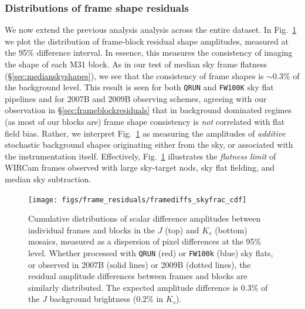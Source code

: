 \documentclass[iop]{emulateapj}
\newcommand{\mycomment}[1]{\textcolor{OliveGreen}{\textit{#1}}} %
\newcommand{\Fig}[1]{Fig.~\ref{fig:#1}}  %
\newcommand{\Sec}[1]{\S\ref{sec:#1}}  %
\begin{document}
\subsubsection{Distributions of frame shape residuals}
\label{sec:frameblockresidualhist}

We now extend the previous analysis analysis across the entire dataset.
In \Fig{frame_diffs_skyfrac} we plot the distribution of frame-block residual shape amplitudes, measured at the 95\% difference interval.
In essence, this measures the consistency of imaging the shape of each M31 block.
As in our test of median sky frame flatness (\Sec{medianskyshapes}), we see that the consistency of frame shapes is $\sim 0.3\%$ of the background level.
This result is seen for both \texttt{QRUN} and \texttt{FW100K} sky flat pipelines and for 2007B and 2009B observing schemes, agreeing with our observation in \Sec{frameblockresiduals} that in background dominated regimes (as most of our blocks are) frame shape consistency is \emph{not} correlated with flat field bias.
Rather, we interpret \Fig{frame_diffs_skyfrac} as measuring the amplitudes of \emph{additive} stochastic background shapes originating either from the sky, or associated with the instrumentation itself.
Effectively, \Fig{frame_diffs_skyfrac} illustrates the \emph{flatness limit} of WIRCam frames observed with large sky-target nods, sky flat fielding, and median sky subtraction.

\begin{figure}[t]
\centering
\texttt{[image: figs/frame\_residuals/framediffs\_skyfrac\_cdf]}
\caption{Cumulative distributions of scalar difference amplitudes between individual frames and blocks in the $J$ (top) and $K_s$ (bottom) mosaics, measured as a dispersion of pixel differences at the 95\% level.
Whether processed with \texttt{QRUN} (red) or \texttt{FW100k} (blue) sky flats, or observed in 2007B (solid lines) or 2009B (dotted lines), the residual amplitude differences between frames and blocks are similarly distributed.
The expected amplitude difference is $0.3\%$ of the $J$ background brightness ($0.2\%$ in $K_s$).
}
\label{fig:frame_diffs_skyfrac}
\end{figure}

\end{document}
